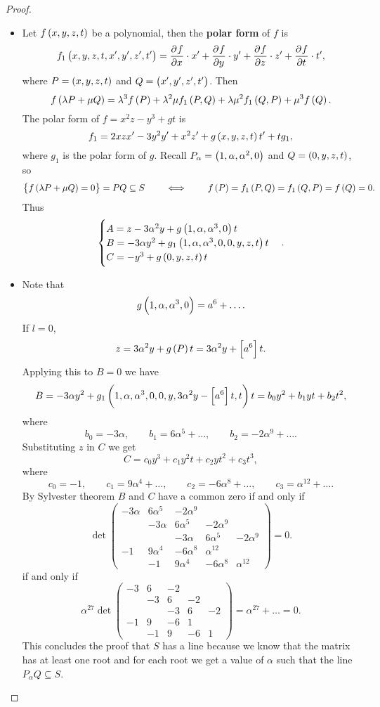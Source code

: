 \begin{proof}
\begin{itemize}
\item Let $ f\br{x, y, z, t} $ be a polynomial, then the \textbf{polar form} of $ f $ is
$$ f_1\br{x, y, z, t, x', y', z', t'} = \dpd{f}{x} \cdot x' + \dpd{f}{y} \cdot y' + \dpd{f}{z} \cdot z' + \dpd{f}{t} \cdot t', $$
where $ P = \br{x, y, z, t} $ and $ Q = \br{x', y', z', t'} $. Then
$$ f\br{\lambda P + \mu Q} = \lambda^3f\br{P} + \lambda^2\mu f_1\br{P, Q} + \lambda\mu^2f_1\br{Q, P} + \mu^3f\br{Q}. $$
The polar form of $ f = x^2z - y^3 + gt $ is
$$ f_1 = 2xzx' - 3y^2y' + x^2z' + g\br{x, y, z, t}t' + tg_1, $$
where $ g_1 $ is the polar form of $ g $. Recall $ P_\alpha = \br{1, \alpha, \alpha^2, 0} $ and $ Q = \br{0, y, z, t} $, so
$$ \cbr{f\br{\lambda P + \mu Q} = 0} = PQ \subseteq S \qquad \iff \qquad f\br{P} = f_1\br{P, Q} = f_1\br{Q, P} = f\br{Q} = 0. $$
Thus
$$
\begin{cases}
A = z - 3\alpha^2y + g\br{1, \alpha, \alpha^3, 0}t \\
B = -3\alpha y^2 + g_1\br{1, \alpha, \alpha^3, 0, 0, y, z, t}t \\
C = -y^3 + g\br{0, y, z, t}t
\end{cases}.
$$
\item Note that
$$ g\br{1, \alpha, \alpha^3, 0} = a^6 + \dots. $$
If $ l = 0 $,
$$ z = 3\alpha^2y + g\br{P}t = 3\alpha^2y + \sbr{a^6}t. $$
Applying this to $ B = 0 $ we have
$$ B = -3\alpha y^2 + g_1\br{1, \alpha, \alpha^3, 0, 0, y, 3\alpha^2y - \sbr{a^6}t, t}t = b_0y^2 + b_1yt + b_2t^2, $$
where
$$ b_0 = -3\alpha, \qquad b_1 = 6\alpha^5 + \dots, \qquad b_2 = -2\alpha^9 + \dots. $$
Substituting $ z $ in $ C $ we get
$$ C = c_0y^3 + c_1y^2t + c_2yt^2 + c_3t^3, $$
where
$$ c_0 = -1, \qquad c_1 = 9\alpha^4 + \dots, \qquad c_2 = -6\alpha^8 + \dots, \qquad c_3 = \alpha^{12} + \dots. $$
By Sylvester theorem $ B $ and $ C $ have a common zero if and only if
$$ \det
\begin{pmatrix}
-3\alpha & 6\alpha^5 & -2\alpha^9 & & \\
& -3\alpha & 6\alpha^5 & -2\alpha^9 & \\
& & -3\alpha & 6\alpha^5 & -2\alpha^9 \\
-1 & 9\alpha^4 & -6\alpha^8 & \alpha^{12} & \\
& -1 & 9\alpha^4 & -6\alpha^8 & \alpha^{12}
\end{pmatrix}
= 0. $$
if and only if
$$ \alpha^{27}\det
\begin{pmatrix}
-3 & 6 & -2 & & \\
& -3 & 6 & -2 & \\
& & -3 & 6 & -2 \\
-1 & 9 & -6 & 1 & \\
& -1 & 9 & -6 & 1
\end{pmatrix}
= \alpha^{27} + \dots = 0. $$
This concludes the proof that $ S $ has a line because we know that the matrix has at least one root and for each root we get a value of $ \alpha $ such that the line $ P_\alpha Q \subseteq S $.
\end{itemize}
\end{proof}

